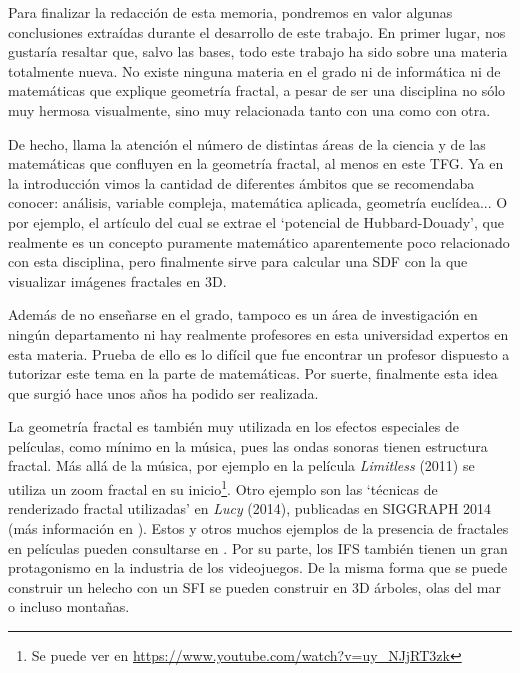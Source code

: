 %
%

Para finalizar la redacción de esta memoria, pondremos en valor algunas conclusiones extraídas durante el desarrollo de este trabajo. En primer lugar, nos gustaría resaltar que, salvo las bases, todo este trabajo ha sido sobre una materia totalmente nueva. No existe ninguna materia en el grado ni de informática ni de matemáticas que explique geometría fractal, a pesar de ser una disciplina no sólo muy hermosa visualmente, sino muy relacionada tanto con una como con otra.

De hecho, llama la atención el número de distintas áreas de la ciencia y de las matemáticas que confluyen en la geometría fractal, al menos en este TFG. Ya en la introducción vimos la cantidad de diferentes ámbitos que se recomendaba conocer: análisis, variable compleja, matemática aplicada, geometría euclídea... O por ejemplo, el artículo \cite{Hubbard-Douady} del cual se extrae el `potencial de Hubbard-Douady', que realmente es un concepto puramente matemático aparentemente poco relacionado con esta disciplina, pero finalmente sirve para calcular una SDF con la que visualizar imágenes fractales en 3D.

Además de no enseñarse en el grado, tampoco es un área de investigación en ningún departamento ni hay realmente profesores en esta universidad expertos en esta materia. Prueba de ello es lo difícil que fue encontrar un profesor dispuesto a tutorizar este tema en la parte de matemáticas. Por suerte, finalmente esta idea que surgió hace unos años ha podido ser realizada.

La geometría fractal es también muy utilizada en los efectos especiales de películas, como mínimo en la música, pues las ondas sonoras tienen estructura fractal. Más allá de la música, por ejemplo en la película \textit{Limitless} (2011) se utiliza un zoom fractal en su inicio\footnote{Se puede ver en \url{https://www.youtube.com/watch?v=uy_NJjRT3zk}}. Otro ejemplo son las `técnicas de renderizado fractal utilizadas' en \textit{Lucy} (2014), publicadas en SIGGRAPH 2014 (más información en \cite{SIGGRAPH-2014}). Estos y otros muchos ejemplos de la presencia de fractales en películas pueden consultarse en \cite{fractals-films}. Por su parte, los IFS también tienen un gran protagonismo en la industria de los videojuegos. De la misma forma que se puede construir un helecho con un SFI se pueden construir en 3D árboles, olas del mar o incluso montañas. 

